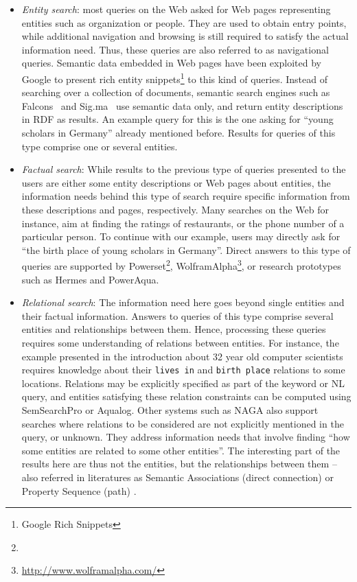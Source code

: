 \begin{itemize}
	\item \emph{Entity search}: most queries on the Web asked for Web pages representing entities such as organization or people. They are used to obtain entry points, while additional navigation and browsing is still required to satisfy the actual information need. Thus, these queries are also referred to as navigational queries. Semantic data embedded in Web pages have been exploited by Google to present rich entity snippets\footnote{Google Rich Snippets} to this kind of queries. Instead of searching over a collection of documents, semantic search engines such as Falcons~\cite{DBLP:journals/ijswis/ChengQ09} and Sig.ma~\cite{DBLP:journals/ws/TummarelloCCDDD10} use semantic data only, and return entity descriptions in RDF as results. An example query for this is the one asking for ``young scholars in Germany'' already mentioned before. Results for queries of this type comprise one or several entities. 
	 
	\item \emph{Factual search}: While results to the previous type of queries presented to the users are either some entity descriptions or Web pages about entities, the information needs behind this type of search require specific information from these descriptions and pages, respectively. Many searches on the Web for instance, aim at finding the ratings of restaurants, or the phone number of a particular person. To continue with our example, users may directly ask for ``the birth place of young scholars in Germany''. Direct answers to this type of queries are supported by Powerset\footnote{}, WolframAlpha\footnote{\url{http://www.wolframalpha.com/}}, or research prototypes such as Hermes and PowerAqua.  
	\item \emph{Relational search}: The information need here goes beyond single entities and their factual information. Answers to queries of this type comprise several entities and relationships between them. Hence, processing these queries requires some understanding of relations between entities. For instance, the example presented in the introduction about 32 year old computer scientists requires knowledge about their \verb+lives in+ and \verb+birth place+ relations to some locations. Relations may be explicitly specified as part of the keyword or NL query, and entities satisfying these relation constraints can be computed using SemSearchPro or Aqualog\dtr{}. Other systems such as NAGA also support searches where relations to be considered are not explicitly mentioned in the query, or unknown. They address information needs that involve finding ``how some entities are related to some other entities''. The interesting part of the results here are thus not the entities, but the relationships between them -- also referred in literatures as Semantic Associations (direct connection) or Property Sequence (path) \cite{DBLP:conf/www/AnyanwuS03}.

	
\end{itemize}

